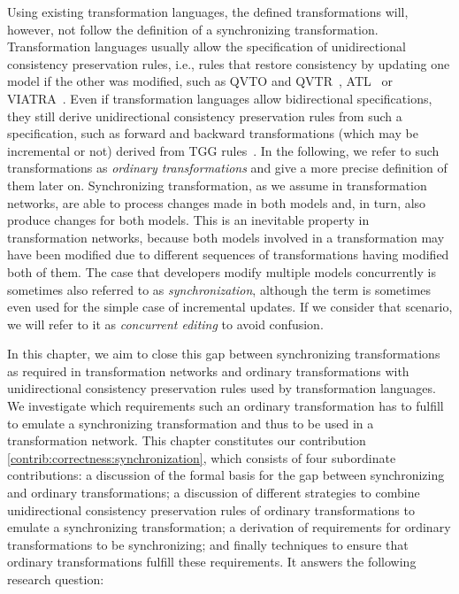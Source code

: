 Using existing transformation languages, the defined transformations will, however, not follow the definition of a synchronizing transformation.
Transformation languages usually allow the specification of unidirectional consistency preservation rules, i.e., rules that restore consistency by updating one model if the other was modified, such as \gls{QVTO} and \gls{QVTR}~\cite{qvt}, \gls{ATL}~\cite{jouault2006a} or \gls{VIATRA}~\cite{bergmann2015viatra-ICMT}.
Even if transformation languages allow bidirectional specifications, they still derive unidirectional consistency preservation rules from such a specification, such as forward and backward transformations (which may be incremental or not) derived from \gls{TGG} rules~\cite{leblebici2014IncrementalTGGSurvey-GTVMT}.
In the following, we refer to such transformations as \emph{ordinary transformations} and give a more precise definition of them later on.
Synchronizing transformation, as we assume in transformation networks, are able to process changes made in both models and, in turn, also produce changes for both models.
This is an inevitable property in transformation networks, because both models involved in a transformation may have been modified due to different sequences of transformations having modified both of them.
The case that developers modify multiple models concurrently is sometimes also referred to as \emph{synchronization}, although the term is sometimes even used for the simple case of incremental updates.
If we consider that scenario, we will refer to it as \emph{concurrent editing} to avoid confusion.

In this chapter, we aim to close this gap between synchronizing transformations as required in transformation networks and ordinary transformations with unidirectional consistency preservation rules used by transformation languages.
We investigate which requirements such an ordinary transformation has to fulfill to emulate a synchronizing transformation and thus to be used in a transformation network.
This chapter constitutes our contribution \autoref{contrib:correctness:synchronization}, which consists of four subordinate contributions: a discussion of the formal basis for the gap between synchronizing and ordinary transformations; a discussion of different strategies to combine unidirectional consistency preservation rules of ordinary transformations to emulate a synchronizing transformation; a derivation of requirements for ordinary transformations to be synchronizing; and finally techniques to ensure that ordinary transformations fulfill these requirements.
It answers the following research question:

